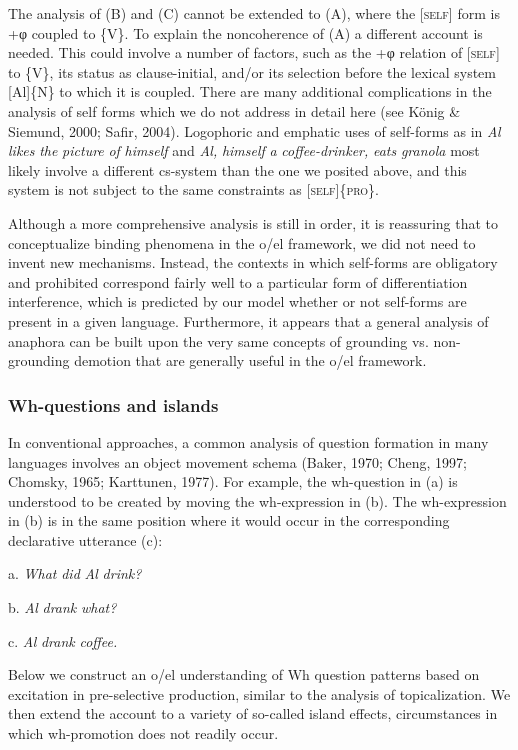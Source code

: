   The analysis of (B) and (C) cannot be extended to (A), where the [\textsc{self}] form is +φ coupled to \{V\}. To explain the noncoherence of (A) a different account is needed. This could involve a number of factors, such as the +φ relation of [\textsc{self}] to \{V\}, its status as clause-initial, and/or its selection before the lexical system [Al]\{N\} to which it is coupled. There are many additional complications in the analysis of self forms which we do not address in detail here (see König \& Siemund, 2000; Safir, 2004). Logophoric and emphatic uses of self-forms as in \textit{Al} \textit{likes} \textit{the} \textit{picture} \textit{of} \textit{himself} and \textit{Al,} \textit{himself} \textit{a} \textit{coffee-drinker,} \textit{eats} \textit{granola} most likely involve a different cs-system than the one we posited above, and this system is not subject to the same constraints as [\textsc{self}]\{\textsc{pro}\}. 

  Although a more comprehensive analysis is still in order, it is reassuring that to conceptualize binding phenomena in the o/el framework, we did not need to invent new mechanisms. Instead, the contexts in which self-forms are obligatory and prohibited correspond fairly well to a particular form of differentiation interference, which is predicted by our model whether or not self-forms are present in a given language. Furthermore, it appears that a general analysis of anaphora can be built upon the very same concepts of grounding vs. non-grounding demotion that are generally useful in the o/el framework.

\subsubsection{Wh-questions and islands}

In conventional approaches, a common analysis of question formation in many languages involves an object movement schema (Baker, 1970; Cheng, 1997; Chomsky, 1965; Karttunen, 1977). For example, the wh-question in (a) is understood to be created by moving the wh-expression in (b). The wh-expression in (b) is in the same position where it would occur in the corresponding declarative utterance (c):

  a.  \textit{What} \textit{did} \textit{Al} \textit{drink?}

  b.  \textit{Al} \textit{drank} \textit{what?}

  c.  \textit{Al} \textit{drank} \textit{coffee.}

  Below we construct an o/el understanding of Wh question patterns based on excitation in pre-selective production, similar to the analysis of topicalization. We then extend the account to a variety of so-called island effects, circumstances in which wh-promotion does not readily occur. 

